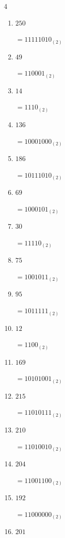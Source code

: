 \begin{multicols}{4}
\begin{enumerate}
        $=10001001_{(2)}$

  \item $250$

        $=11111010_{(2)}$

  \item $49$

        $=110001_{(2)}$

  \item $14$

        $=1110_{(2)}$

  \item $136$

        $=10001000_{(2)}$

  \item $186$

        $=10111010_{(2)}$

  \item $69$

        $=1000101_{(2)}$

  \item $30$

        $=11110_{(2)}$

  \item $75$

        $=1001011_{(2)}$

  \item $95$

        $=1011111_{(2)}$

  \item $12$

        $=1100_{(2)}$

  \item $169$

        $=10101001_{(2)}$

\columnbreak %

  \item $215$

        $=11010111_{(2)}$

  \item $210$

        $=11010010_{(2)}$

  \item $204$

        $=11001100_{(2)}$

  \item $192$

        $=11000000_{(2)}$

  \item $201$


\end{enumerate}
\end{multicols}
